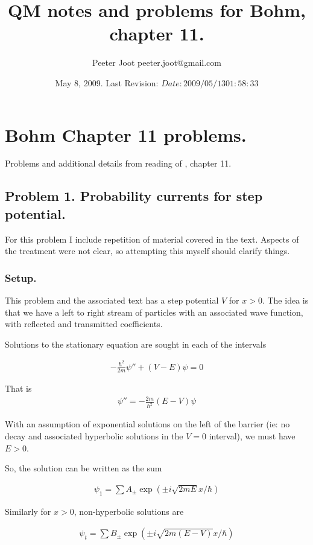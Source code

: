 \documentclass{article}
\title{ QM notes and problems for Bohm, chapter 11. }
\author{Peeter Joot \quad peeter.joot@gmail.com }
\date{ May 8, 2009.  Last Revision: $Date: 2009/05/13 01:58:33 $ }
\begin{document}
\maketitle{}
\tableofcontents
\section{ Bohm Chapter 11 problems. }

Problems and additional details from reading of \cite{bohm1989qt}, chapter 11.

\subsection{ Problem 1.  Probability currents for step potential. }

For this problem I include repetition of material covered in the text.
Aspects of the treatment were not clear, so attempting this myself
should clarify things.

\subsubsection{ Setup. }

This problem and the associated text has a step potential $V$ for $x>0$.  The
idea is that we have a left to right stream of particles with an associated
wave function, with reflected and transmitted coefficients.

Solutions to the stationary equation are sought in each of the intervals

\begin{align}
-\frac{\hbar^2}{2m}\psi'' + (V-E)\psi = 0
\end{align}

That is
\begin{align}
\psi'' = - \frac{2m}{\hbar^2} (E-V)\psi
\end{align}

With an assumption of exponential solutions on the left of the barrier
(ie: no decay and associated hyperbolic solutions in the $V=0$ interval),
we must have $E>0$.

So, the solution can be written as the sum

\begin{align*}
\psi_1 = \sum A_{\pm} \exp\left( \pm i \sqrt{2mE} x / \hbar \right)
\end{align*}

Similarly for $x>0$, non-hyperbolic solutions are

\begin{align*}
\psi_t = \sum B_{\pm} \exp\left( \pm i \sqrt{2m(E-V)} x / \hbar \right)
\end{align*}
\end{document}
